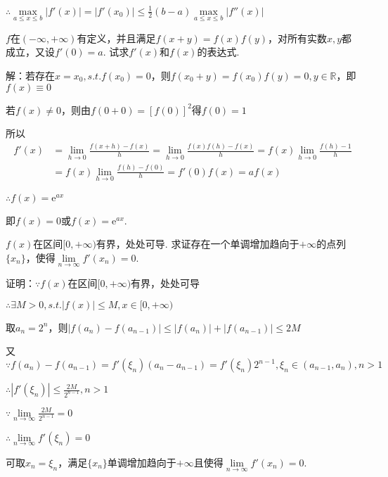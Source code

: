 \documentclass[12pt,UTF8]{ctexart}
\begin{document}
\begin{enumerate}
$\therefore\max\limits_{a\leq x\leq b}|f'(x)|=|f'(x_0)|\leq\frac12(b-a)\max\limits_{a\leq x\leq b}|f''(x)|$

$f$在$(-\infty,+\infty)$有定义，并且满足$f(x+y)=f(x)f(y)$，对所有实数$x,y$都成立，又设$f'(0)=a$. 试求$f'(x)$和$f(x)$的表达式.

解：若存在$x=x_0,s.t.f(x_0)=0$，则$f(x_0+y)=f(x_0)f(y)=0,y\in\mathbb R$，即$f(x)\equiv0$

若$f(x)\neq0$，则由$f(0+0)=[f(0)]^2$得$f(0)=1$

所以
\[\begin{split}
f'(x)&=\lim\limits_{h\rightarrow0}\frac{f(x+h)-f(x)}h=\lim\limits_{h\rightarrow0}\frac{f(x)f(h)-f(x)}h=f(x)\lim\limits_{h\rightarrow0}\frac{f(h)-1}h\\
&=f(x)\lim\limits_{h\rightarrow0}\frac{f(h)-f(0)}h=f'(0)f(x)=af(x)
\end{split}\]

$\therefore f(x)=\mathrm e^{ax}$

即$f(x)=0$或$f(x)=\mathrm e^{ax}$.

$f(x)$在区间$[0,+\infty)$有界，处处可导. 求证存在一个单调增加趋向于$+\infty$的点列$\{x_n\}$，使得$\lim\limits_{n\rightarrow\infty}f'(x_n)=0$.

证明：$\because f(x)$在区间$[0,+\infty)$有界，处处可导

$\therefore\exists M>0,s.t.|f(x)|\leq M,x\in[0,+\infty)$

取$a_n=2^n$，则$|f(a_n)-f(a_{n-1})|\leq|f(a_n)|+|f(a_{n-1})|\leq2M$

又$\because f(a_n)-f(a_{n-1})=f'(\xi_n)(a_n-a_{n-1})=f'(\xi_n)2^{n-1},\xi_n\in(a_{n-1},a_n),n>1$

$\therefore|f'(\xi_n)|\leq\frac{2M}{2^{n-1}},n>1$

$\because\lim\limits_{n\rightarrow\infty}\frac{2M}{2^{n-1}}=0$

$\therefore\lim\limits_{n\rightarrow\infty}f'(\xi_n)=0$

可取$x_n=\xi_n$，满足$\{x_n\}$单调增加趋向于$+\infty$且使得$\lim\limits_{n\rightarrow\infty}f'(x_n)=0$.
\end{enumerate}
\end{document}
